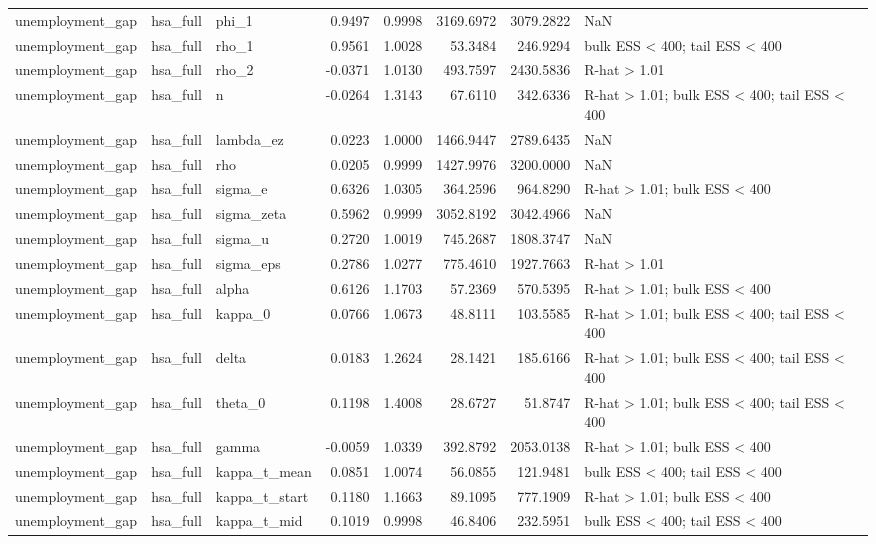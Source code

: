 \begin{tabular}{lllrrrrl}
unemployment\_gap & hsa\_full & phi\_1 & 0.9497 & 0.9998 & 3169.6972 & 3079.2822 & NaN \\
unemployment\_gap & hsa\_full & rho\_1 & 0.9561 & 1.0028 & 53.3484 & 246.9294 & bulk ESS < 400; tail ESS < 400 \\
unemployment\_gap & hsa\_full & rho\_2 & -0.0371 & 1.0130 & 493.7597 & 2430.5836 & R-hat > 1.01 \\
unemployment\_gap & hsa\_full & n & -0.0264 & 1.3143 & 67.6110 & 342.6336 & R-hat > 1.01; bulk ESS < 400; tail ESS < 400 \\
unemployment\_gap & hsa\_full & lambda\_ez & 0.0223 & 1.0000 & 1466.9447 & 2789.6435 & NaN \\
unemployment\_gap & hsa\_full & rho & 0.0205 & 0.9999 & 1427.9976 & 3200.0000 & NaN \\
unemployment\_gap & hsa\_full & sigma\_e & 0.6326 & 1.0305 & 364.2596 & 964.8290 & R-hat > 1.01; bulk ESS < 400 \\
unemployment\_gap & hsa\_full & sigma\_zeta & 0.5962 & 0.9999 & 3052.8192 & 3042.4966 & NaN \\
unemployment\_gap & hsa\_full & sigma\_u & 0.2720 & 1.0019 & 745.2687 & 1808.3747 & NaN \\
unemployment\_gap & hsa\_full & sigma\_eps & 0.2786 & 1.0277 & 775.4610 & 1927.7663 & R-hat > 1.01 \\
unemployment\_gap & hsa\_full & alpha & 0.6126 & 1.1703 & 57.2369 & 570.5395 & R-hat > 1.01; bulk ESS < 400 \\
unemployment\_gap & hsa\_full & kappa\_0 & 0.0766 & 1.0673 & 48.8111 & 103.5585 & R-hat > 1.01; bulk ESS < 400; tail ESS < 400 \\
unemployment\_gap & hsa\_full & delta & 0.0183 & 1.2624 & 28.1421 & 185.6166 & R-hat > 1.01; bulk ESS < 400; tail ESS < 400 \\
unemployment\_gap & hsa\_full & theta\_0 & 0.1198 & 1.4008 & 28.6727 & 51.8747 & R-hat > 1.01; bulk ESS < 400; tail ESS < 400 \\
unemployment\_gap & hsa\_full & gamma & -0.0059 & 1.0339 & 392.8792 & 2053.0138 & R-hat > 1.01; bulk ESS < 400 \\
unemployment\_gap & hsa\_full & kappa\_t\_mean & 0.0851 & 1.0074 & 56.0855 & 121.9481 & bulk ESS < 400; tail ESS < 400 \\
unemployment\_gap & hsa\_full & kappa\_t\_start & 0.1180 & 1.1663 & 89.1095 & 777.1909 & R-hat > 1.01; bulk ESS < 400 \\
unemployment\_gap & hsa\_full & kappa\_t\_mid & 0.1019 & 0.9998 & 46.8406 & 232.5951 & bulk ESS < 400; tail ESS < 400 \\

\end{tabular}
